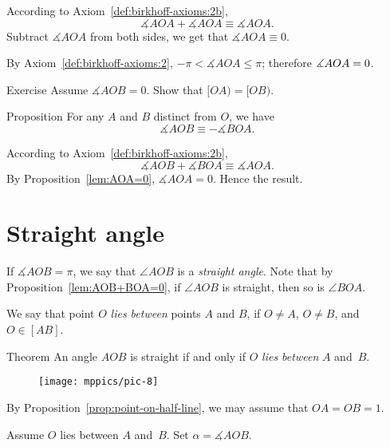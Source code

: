 According to Axiom~\ref{def:birkhoff-axioms:2b},
$$\measuredangle A O A
+
\measuredangle A O A 
\equiv
\measuredangle A O A.$$
Subtract  $\measuredangle A O A$ from both sides, we get that
$\measuredangle A O A \equiv 0$.

By Axiom~\ref{def:birkhoff-axioms:2}, $-\pi<\measuredangle A O A\le \pi$;
therefore $\measuredangle A O A = 0$.
\qeds

\begin{thm}{Exercise}\label{ex:2.4} 
Assume $\measuredangle A O B= 0$.
Show that $[OA)=[OB)$.
\end{thm}

\begin{thm}[\abs]{Proposition}\label{lem:AOB+BOA=0}
For any $A$ and $B$ distinct from $O$,
we have 
$$\measuredangle A O B\equiv-\measuredangle B O A.$$

\end{thm}

According to Axiom~\ref{def:birkhoff-axioms:2b},
$$\measuredangle A O B+\measuredangle B O A \equiv\measuredangle A O A.$$
By Proposition~\ref{lem:AOA=0}, $\measuredangle A O A=0$.
Hence the result.
\qeds

\section{Straight angle}

If $\measuredangle A O B=\pi$,
we say that $\angle A O B$ is a 
\emph{straight angle}.
Note that by Proposition~\ref{lem:AOB+BOA=0}, 
if $\angle A O B$ is straight,
then so is $\angle B O A$.

We say that point $O$ \emph{lies between} points $A$ and $B$, 
if $O\not= A$, $O\not= B$, and $O\in[A B]$.

\begin{thm}[\abs]{Theorem}\label{thm:straight-angle}
An angle $A O B$ is straight 
if and only if $O$ 
\emph{lies between} $A$ and~$B$.
\end{thm}

\begin{wrapfigure}{r}{40mm}
\centering
\vskip-8mm
\texttt{[image: mppics/pic-8]}
\end{wrapfigure}

By Proposition~\ref{prop:point-on-half-line},  we may assume that
$O A = O B = 1$.

Assume $O$  
lies between $A$ and~$B$.
Set  $\alpha=\measuredangle A O B$.

